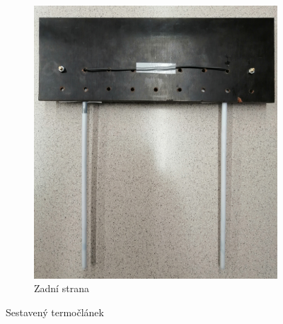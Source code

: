 \begin{figure}[htpb]
\begin{subfigure}{0.45\textwidth}
        \includegraphics[width=0.95\linewidth]{figures/termoclanek_back.jpg}
        \caption{Zadní strana}
    \end{subfigure}
    \hfill
    \caption{Sestavený termočlánek}
\end{figure}


